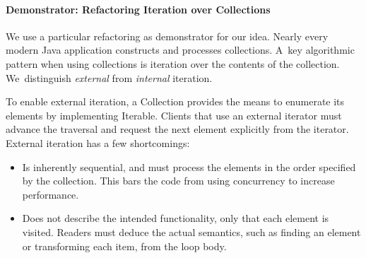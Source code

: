 \documentclass[runningheads,a4paper]{llncs}
\begin{document}
\paragraph{Demonstrator: Refactoring Iteration over Collections}

We use a particular refactoring as demonstrator for our idea. Nearly every
modern Java application constructs and processes collections.  A~key
algorithmic pattern when using collections is iteration over the contents of
the collection.  We~distinguish {\em external} from {\em
internal} iteration.

To enable external iteration, a Collection provides the means to enumerate
its elements by implementing Iterable.
Clients that use an external iterator must advance the traversal and
request the next element explicitly from the iterator.  External
iteration has a few shortcomings:
%
\begin{itemize}
%
\item Is inherently sequential, and must process the elements in the order
specified by the collection. This bars the code from using concurrency
to increase performance.
%
\item Does not describe the intended functionality, only that each element
is visited. Readers must deduce the actual semantics, such as finding an element
or transforming each item, from the loop body.
%
\end{itemize}

\end{document}
